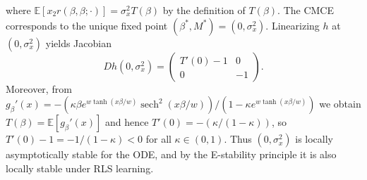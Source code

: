 \documentclass[11pt]{article}
\begin{document}
where $\mathbb E[x_2 r(\beta,\beta;\cdot)]=\sigma_x^2 T(\beta)$ by the definition of $T(\beta)$. The CMCE corresponds to the unique fixed point $(\beta^*,M^*)=(0,\sigma_x^2)$. Linearizing $h$ at $(0,\sigma_x^2)$ yields Jacobian
\[
Dh(0,\sigma_x^2)=
\begin{pmatrix}
T'(0)-1 & 0\\
0 & -1
\end{pmatrix}.
\]
Moreover, from $g_\beta'(x)=-(\kappa\beta e^{w\tanh(x\beta/w)}\operatorname{sech}^2(x\beta/w))/(1-\kappa e^{w\tanh(x\beta/w)})$ we obtain
$T(\beta)=\mathbb E[g_\beta'(x)]$ and hence $T'(0)=-(\kappa/(1-\kappa))$, so $T'(0)-1=-1/(1-\kappa)<0$ for all $\kappa\in(0,1)$. Thus $(0,\sigma_x^2)$ is locally asymptotically stable for the ODE, and by the E-stability principle it is also locally stable under RLS learning.
\end{document}
